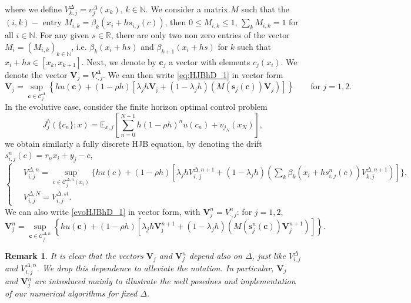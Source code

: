 \documentclass[11pt]{article}
\numberwithin{equation}{section}
\newtheorem{remark}[theorem]{Remark}
\theoremstyle{Claim}
\newcommand{\EE}{\mathbb{E}}
\newcommand{\R}{\mathbb{R}}
\newcommand{\N}{\mathbb{N}}
\newcommand{\mC}{\mathcal C}
\def\bV{{\mathbf{V}}}
\def\bjm{{\bar{\jmath}}}
\theoremstyle{plain}
\newcommand{\D}{\Delta}
\begin{document}
where we define $V^{\D}_{k,j}= v^{\D}_{j}(x_k)$, $k\in \N$. We consider a matrix $M$ such that the $(i,k)-$ entry $M_{i,k}=\beta_k(x_i+hs_{i,j}(c))$, then $0\le M_{i,k}\le 1 $, $\sum_k M_{i,k}=1$ for all $i\in\N$. For any given $s\in \R$, there are only two non zero entries of the vector $M_{i}=(M_{i,k})_{k\in\N}$, i.e. $\beta_k(x_i+hs)$ and $\beta_{k+1}(x_{i}+hs)$ for $k$ such that $x_i+hs \in [x_k, x_{k+1}]$. Next, we denote by $\mathbf{c}_j$ a vector with elements $c_j(x_i)$. We denote the vector $\bV_j=V^{\D}_{\cdot,j}$. We can then write  \cref{eq:HJBhD_1} in vector form
\begin{equation}\label{eq:HJB_vect}
\bV_j=\sup_{\mathbf{c}\in \mC^{\D}_{j}}\left\{
hu(\mathbf{c})+(1-\rho h)\left[\lambda_j h\bV_{\bjm} 
+(1-\lambda_jh)\left(M(\mathbf{s}_j(\mathbf{c}))\bV_j\right)\right]
\right\}\qquad \text{for }j=1,2.
\end{equation}
In the evolutive case, consider the finite horizon optimal control problem 
\begin{equation*}
J^{h}_{j} (\{c_n\}; x)=\EE_{x,j}\left[\sum_{n=0}^{N-1} h(1-\rho h)^n u(c_n)+v_{j_N}(x_N)\right],
\end{equation*}
we obtain similarly a fully discrete HJB equation, by denoting the drift $s^n_{i,j}(c)=r_nx_i+y_j-c$,
\begin{equation}\label{evoHJBhD_1}
\left\{\begin{aligned}
\,&		V^{\D,n}_{i,j}	=\sup_{c\in \mC^{\D,n}_{j}(x_i)}\Biggl\{
		hu(c)
		+(1-\rho h)\left[\lambda_j hV^{\D,n+1}_{i,\bjm} 
		+(1-\lambda_jh)\left(\sum_k \beta_k\left(x_i+hs^n_{i,j}(c)\right)V^{\D,n+1}_{k,j}\right)\right]
		\Biggl\},\\
& V^{\D,N}_{i,j}=V^{\D,st}_{i,j}.
\end{aligned}\right.
\end{equation}  
We can also write \cref{evoHJBhD_1} in vector form, with $\bV^n_{j}=V^n_{\cdot,j}$: for $j=1,2$,
\begin{equation}\label{evoHJB vector}
\bV^n_{j}=\sup_{\mathbf{c}\in \mC^{\D,n}_{j}}\left\{
hu(\mathbf{c})+(1-\rho h)\left[\lambda_j h\bV^{n+1}_{\bjm} 
+(1-\lambda_jh)\left(M\left(\mathbf{s}^n_{j}(\mathbf{c})\right)\bV^{n+1}_{j}\right)\right]
\right\}.
\end{equation}       
\begin{remark}
It is clear that the vectors $\bV_{j}$ and $\bV^n_{j}$ depend also on $\D$, just like $V^{\D}_{i,j}$ and $V^{\D,n}_{i,j}$. We drop this dependence to alleviate the notation. In particular, $\bV_{j}$ and $\bV^n_{j}$ are introduced mainly to illustrate the well posednes and implementation of our numerical algorithms for fixed $\D$. 
\end{remark}  
                                                                                     
\end{document}
